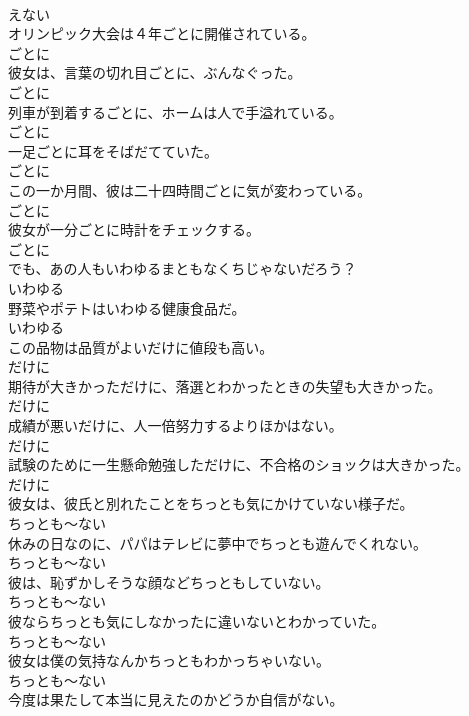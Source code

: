 \documentclass[8pt]{extreport}
\begin{document}
\begin{CJK}{UTF8}{min}
\\	えない
\\	オリンピック大会は４年ごとに開催されている。	
\\	ごとに
\\	彼女は、言葉の切れ目ごとに、ぶんなぐった。	
\\	ごとに
\\	列車が到着するごとに、ホームは人で手溢れている。	
\\	ごとに
\\	一足ごとに耳をそばだてていた。	
\\	ごとに
\\	この一か月間、彼は二十四時間ごとに気が変わっている。	
\\	ごとに
\\	彼女が一分ごとに時計をチェックする。	
\\	ごとに
\\	でも、あの人もいわゆるまともなくちじゃないだろう？	
\\	いわゆる
\\	野菜やポテトはいわゆる健康食品だ。	
\\	いわゆる
\\	この品物は品質がよいだけに値段も高い。	
\\	だけに
\\	期待が大きかっただけに、落選とわかったときの失望も大きかった。	
\\	だけに
\\	成績が悪いだけに、人一倍努力するよりほかはない。	
\\	だけに
\\	試験のために一生懸命勉強しただけに、不合格のショックは大きかった。	
\\	だけに
\\	彼女は、彼氏と別れたことをちっとも気にかけていない様子だ。	
\\	ちっとも～ない
\\	休みの日なのに、パパはテレビに夢中でちっとも遊んでくれない。	
\\	ちっとも～ない
\\	彼は、恥ずかしそうな顔などちっともしていない。	
\\	ちっとも～ない
\\	彼ならちっとも気にしなかったに違いないとわかっていた。	
\\	ちっとも～ない
\\	彼女は僕の気持なんかちっともわかっちゃいない。	
\\	ちっとも～ない
\\	今度は果たして本当に見えたのかどうか自信がない。	

\end{CJK}
\end{document}
